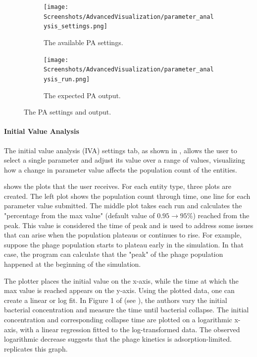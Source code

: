 \begin{figure}[h!]
    \centering
    \begin{subfigure}{0.49\linewidth}
        \centering
        \captionsetup{width=1\linewidth}
        \texttt{[image: Screenshots/AdvancedVisualization/parameter\_analysis\_settings.png]}
        \caption{
            The available PA settings. 
        }
        \label{fig:ss:av:parameter_analysis_settings}
    \end{subfigure}
    \hfill
    \begin{subfigure}{0.49\linewidth}
        \centering
        \captionsetup{width=1\linewidth}
        \texttt{[image: Screenshots/AdvancedVisualization/parameter\_analysis\_run.png]}
        \caption{
            The expected PA output. 
        }
        \label{fig:ss:av:parameter_analysis_run}
    \end{subfigure}
    \caption{The PA settings and output.}
\end{figure}

\paragraph{Initial Value Analysis}
\label{sec:initial_value_analysis}
The initial value analysis (IVA) settings tab, as shown in , allows the user to select a single parameter and adjust its value over a range of values, visualizing how a change in parameter value affects the population count of the entities.

 shows the plots that the user receives.
For each entity type, three plots are created.
The left plot shows the population count through time, one line for each parameter value submitted.
The middle plot takes each run and calculates the "percentage from the max value" (default value of $0.95 \rightarrow 95\%$) reached from the peak.
This value is considered the time of peak and is used to address some issues that can arise when the population plateaus or continues to rise.
For example, suppose the phage population starts to plateau early in the simulation. 
In that case, the program can calculate that the "peak" of the phage population happened at the beginning of the simulation. 

The plotter places the initial value on the x-axis, while the time at which the max value is reached appears on the y-axis. 
Using the plotted data, one can create a linear or log fit.
In Figure 1 of \citet{mullaExtremeDiversityPhage2024} (see ), the authors vary the initial bacterial concentration and measure the time until bacterial collapse. 
The initial concentration and corresponding collapse time are plotted on a logarithmic x-axis, with a linear regression fitted to the log-transformed data.
The observed logarithmic decrease suggests that the phage kinetics is adsorption-limited. 
 replicates this graph. 

